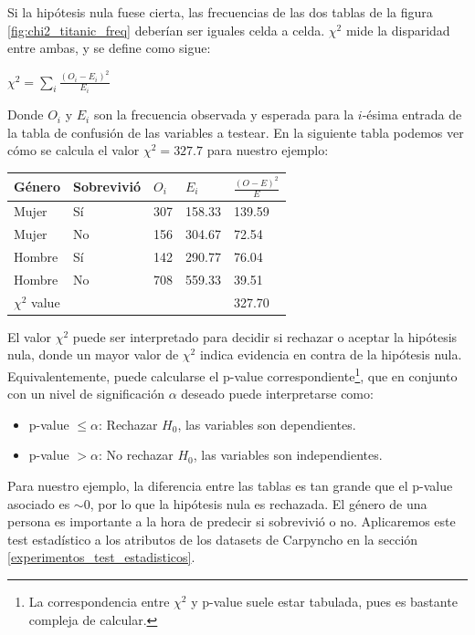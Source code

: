 Si la hipótesis nula fuese cierta, las frecuencias de las dos tablas de la figura \ref{fig:chi2_titanic_freq} deberían ser iguales celda a celda. $\chi^2$ mide la disparidad entre ambas, y se define como sigue:

\begin{center}
$\chi^2 = \sum_i \frac{(O_i - E_i)^2}{E_i}$
\end{center}

Donde $O_i$ y $E_i$ son la frecuencia observada y esperada para la $i$-ésima entrada de la tabla de confusión de las variables a testear. En la siguiente tabla podemos ver cómo se calcula el valor $\chi^2 = 327.7$ para nuestro ejemplo:

\begin{table}[h!]
\center
\begin{tabular}{|l|l|l|l|l|}
\hline
\textbf{Género}  & \textbf{Sobrevivió}    & $O_i$   & $E_i$    &  $\frac{ (O-E)^2 }{E}$ \\ \hline
Mujer   & Sí    & 307     & 158.33   &  139.59                \\ \hline
Mujer   & No  & 156     & 304.67   &  72.54                 \\ \hline
Hombre  & Sí    & 142     & 290.77   &  76.04                 \\ \hline
Hombre  & No  & 708     & 559.33   &  39.51                 \\ \hline
$\chi^2$ value &   &    &         &           327.70                \\ \hline
\end{tabular}
\end{table}

El valor $\chi^2$ puede ser interpretado para decidir si rechazar o aceptar la hipótesis nula, donde un mayor valor de $\chi^2$ indica evidencia en contra de la hipótesis nula. Equivalentemente, puede calcularse el p-value correspondiente\footnote{La correspondencia entre $\chi^2$ y p-value suele estar tabulada, pues es bastante compleja de calcular.}, que en conjunto con un nivel de significación $\alpha$ deseado puede interpretarse como: 

\begin{itemize}
\item p-value $\leq \alpha$: Rechazar $H_0$, las variables son dependientes.
\item p-value $> \alpha$: No rechazar $H_0$,  las variables son independientes.
\end{itemize}

Para nuestro ejemplo, la diferencia entre las tablas es tan grande que el p-value asociado es $\sim0$, por lo que la hipótesis nula es rechazada. El género de una persona es importante a la hora de predecir si sobrevivió o no. Aplicaremos este test estadístico a los atributos de los datasets de Carpyncho en la sección \ref{experimentos_test_estadisticos}. \\

